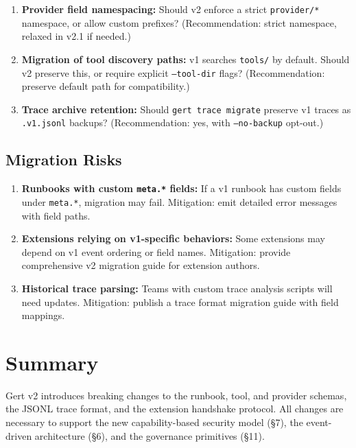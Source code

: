 \begin{enumerate}
  \item \textbf{Provider field namespacing:} Should v2 enforce a strict \texttt{provider/*} namespace, or allow custom prefixes? (Recommendation: strict namespace, relaxed in v2.1 if needed.)
  \item \textbf{Migration of tool discovery paths:} v1 searches \texttt{tools/} by default. Should v2 preserve this, or require explicit \texttt{--tool-dir} flags? (Recommendation: preserve default path for compatibility.)
  \item \textbf{Trace archive retention:} Should \texttt{gert trace migrate} preserve v1 traces as \texttt{.v1.jsonl} backups? (Recommendation: yes, with \texttt{--no-backup} opt-out.)
\end{enumerate}

\subsection{Migration Risks}

\begin{enumerate}
  \item \textbf{Runbooks with custom \texttt{meta.*} fields:} If a v1 runbook has custom fields under \texttt{meta.*}, migration may fail. Mitigation: emit detailed error messages with field paths.
  \item \textbf{Extensions relying on v1-specific behaviors:} Some extensions may depend on v1 event ordering or field names. Mitigation: provide comprehensive v2 migration guide for extension authors.
  \item \textbf{Historical trace parsing:} Teams with custom trace analysis scripts will need updates. Mitigation: publish a trace format migration guide with field mappings.
\end{enumerate}

\section{Summary}

Gert v2 introduces breaking changes to the runbook, tool, and provider schemas, the JSONL trace format, and the extension handshake protocol. All changes are necessary to support the new capability-based security model (§7), the event-driven architecture (§6), and the governance primitives (§11).

